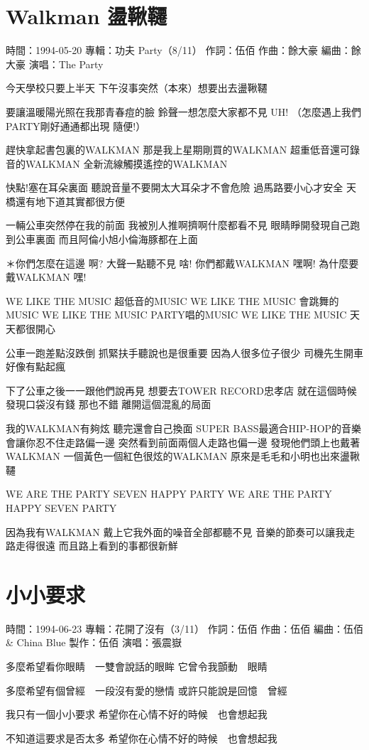 \documentclass[UTF8,a4paper,oneside,twocolumn,12pt]{ctexbook}
\newcommand{\infopair}[2]{\textbullet #1：#2}
\newcommand{\zc}[1][伍佰]{\infopair{作詞}{#1}}
\newcommand{\zq}[1][伍佰]{\infopair{作曲}{#1}}
\newcommand{\bq}[1][伍佰]{\infopair{編曲}{#1}}
\newcommand{\zj}[1]{\infopair{專輯}{#1}}
\newcommand{\zz}[1]{\infopair{製作}{#1}}
\newcommand{\sj}[1]{\infopair{時間}{#1}}
\newenvironment{info}{\begin{flushleft}\kaishu
	}
	{\end{flushleft}\normalsize\yahei\par}
\newenvironment{lyric}{
	}
{}
\begin{document}
\section{Walkman 盪鞦韆}
\begin{info}
	\sj{1994-05-20}
	\zj{功夫 Party（8/11）}
	\zc
	\zq[餘大豪]
	\bq[餘大豪]
	\infopair{演唱}{The Party}
\end{info}
\begin{lyric}
	今天學校只要上半天
	下午沒事突然（本來）想要出去盪鞦韆

	要讓溫暖陽光照在我那青春痘的臉
	鈴聲一想怎麼大家都不見 UH!
	（怎麼遇上我們PARTY剛好通通都出現 隨便!）

	趕快拿起書包裏的WALKMAN
	那是我上星期剛買的WALKMAN
	超重低音還可錄音的WALKMAN
	全新流線觸摸遙控的WALKMAN

	快點!塞在耳朵裏面 聽說音量不要開太大耳朵才不會危險
	過馬路要小心才安全 天橋還有地下道其實都很方便

	一輛公車突然停在我的前面
	我被別人推啊擠啊什麼都看不見
	眼睛睜開發現自己跑到公車裏面
	而且阿倫小旭小倫海豚都在上面

	＊你們怎麼在這邊 啊?
	大聲一點聽不見 啥!
	你們都戴WALKMAN 嘿啊!
	為什麼要戴WALKMAN 嘿!

	WE LIKE THE MUSIC 超低音的MUSIC
	WE LIKE THE MUSIC 會跳舞的MUSIC
	WE LIKE THE MUSIC PARTY唱的MUSIC
	WE LIKE THE MUSIC 天天都很開心

	公車一跑差點沒跌倒 抓緊扶手聽說也是很重要
	因為人很多位子很少 司機先生開車好像有點起瘋

	下了公車之後一一跟他們說再見
	想要去TOWER RECORD忠孝店
	就在這個時候發現口袋沒有錢 那也不錯
	離開這個混亂的局面

	我的WALKMAN有夠炫 聽完還會自己換面
	SUPER BASS最適合HIP-HOP的音樂
	會讓你忍不住走路偏一邊 突然看到前面兩個人走路也偏一邊
	發現他們頭上也戴著WALKMAN
	一個黃色一個紅色很炫的WALKMAN
	原來是毛毛和小明也出來盪鞦韆

	WE ARE THE PARTY
	SEVEN HAPPY PARTY
	WE ARE THE PARTY
	HAPPY SEVEN PARTY

	因為我有WALKMAN
	戴上它我外面的噪音全部都聽不見
	音樂的節奏可以讓我走路走得很遠
	而且路上看到的事都很新鮮
\end{lyric}

\section{小小要求}
\begin{info}
	\sj{1994-06-23}
	\zj{花開了沒有（3/11）}
	\zc
	\zq
	\bq[伍佰 \& China Blue]
	\zz{伍佰}
	\infopair{演唱}{張震嶽}
\end{info}
\begin{lyric}
	多麼希望看你眼睛　一雙會說話的眼眸
	它曾令我顫動　眼睛

	多麼希望有個曾經　一段沒有愛的戀情
	或許只能說是回憶　曾經

	我只有一個小小要求
	希望你在心情不好的時候　也會想起我

	不知道這要求是否太多
	希望你在心情不好的時候　也會想起我
\end{lyric}
\end{document}

